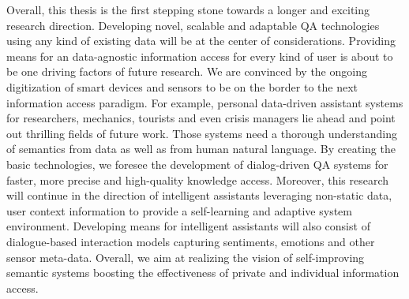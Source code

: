 Overall, this thesis is the first stepping stone towards a longer and exciting research direction. 
Developing novel, scalable and adaptable \ac{QA} technologies using any kind of existing data will be at the center of considerations.
Providing means for an data-agnostic information access for every kind of user is about to be one driving factors of future research. 
We are convinced by the ongoing digitization of smart devices and sensors to be on the border to the next information access paradigm.  
For example, personal data-driven assistant systems for researchers, mechanics, tourists and even crisis managers lie  ahead and point out thrilling fields of future work.
Those systems need a thorough understanding of semantics from data as well as from human natural language. 
By creating the basic technologies, we foresee the development of dialog-driven \ac{QA} systems for faster, more precise and high-quality knowledge access.
Moreover, this research will continue in the direction of intelligent assistants leveraging non-static data, user context information to provide a self-learning and adaptive system environment.
Developing means for intelligent assistants will also consist of dialogue-based interaction models capturing sentiments, emotions and other sensor meta-data.
Overall, we aim at realizing the vision of self-improving semantic systems boosting the effectiveness of private and individual information access.